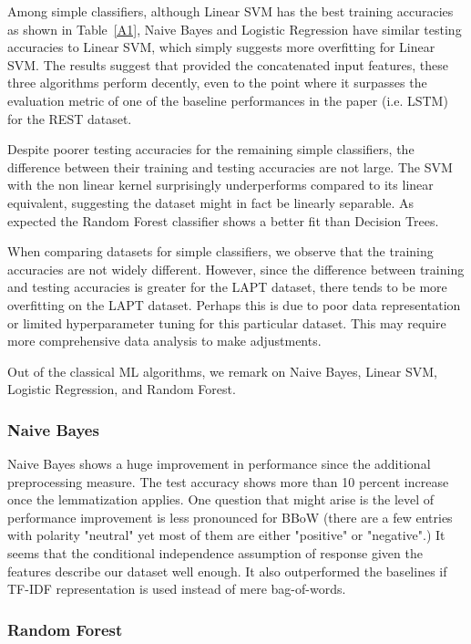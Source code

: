 \documentclass[comsoc,conference]{IEEEtran}
\begin{document}
Among simple classifiers, although Linear SVM has the best training accuracies as shown in Table~\ref{A1}, Naive Bayes and Logistic Regression have similar testing accuracies to Linear SVM, which simply suggests more overfitting for Linear SVM. The results suggest that provided the concatenated input features, these three algorithms perform decently, even to the point where it surpasses the evaluation metric of one of the baseline performances in the paper (i.e. LSTM) for the REST dataset. 

Despite poorer testing accuracies for the remaining simple classifiers, the difference between their training and testing accuracies are not large. The SVM with the non linear kernel surprisingly underperforms compared to its linear equivalent, suggesting the dataset might in fact be linearly separable. As expected the Random Forest classifier shows a better fit than Decision Trees. 

When comparing datasets for simple classifiers, we observe that the training accuracies are not widely different. However, since the difference between training and testing accuracies is greater for the LAPT dataset, there tends to be more overfitting on the LAPT dataset. Perhaps this is due to poor data representation or limited hyperparameter tuning for this particular dataset. This may require more comprehensive data analysis to make adjustments. 

Out of the classical ML algorithms, we remark on Naive Bayes, Linear SVM, Logistic Regression, and Random Forest.

\subsubsection{Naive Bayes}

Naive Bayes shows a huge improvement in performance since the additional preprocessing measure. The test accuracy shows more than 10 percent increase once the lemmatization applies. One question that might arise is the level of performance improvement is less pronounced for BBoW (there are a few entries with polarity "neutral" yet most of them are either "positive" or "negative".) It seems that the conditional independence assumption of response given the features describe our dataset well enough. It also outperformed the baselines if TF-IDF representation is used instead of mere bag-of-words.

\subsubsection{Random Forest}
\end{document}
